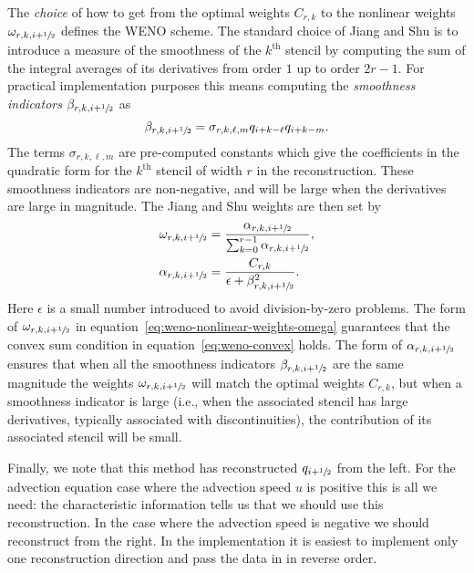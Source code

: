 The \emph{choice} of how to get from the optimal weights $C_{r, k}$ to the
nonlinear weights $\omega_{r, k, i+{\sfrac{1}{2}}}$ defines the WENO scheme. The
standard choice of Jiang and Shu is to introduce a measure of the smoothness of
the $k^{\text{th}}$ stencil by computing the sum of the integral averages of
its derivatives from order $1$ up to order $2 r - 1$. For practical
implementation purposes this means computing the \emph{smoothness indicators}
$\beta_{r, k, i+{\sfrac{1}{2}}}$ as
\begin{equation}
  \label{eq:weno-smoothness}
  \beta_{r, k, i+{\sfrac{1}{2}}} = \sigma_{r, k, \ell, m} q_{i+k-\ell} q_{i+k-m}.
\end{equation}
The terms $\sigma_{r, k, \ell, m}$ are pre-computed constants which give the
coefficients in the quadratic form for the $k^{\text{th}}$ stencil of width $r$
in the reconstruction. These smoothness indicators are non-negative, and will
be large when the derivatives are large in magnitude. The Jiang and Shu weights
are then set by
\begin{subequations}
  \label{eq:weno-nonlinear-weights}
  \begin{align}
    \label{eq:weno-nonlinear-weights-omega}
    \omega_{r, k, i+{\sfrac{1}{2}}} &= \frac{\alpha_{r, k, i+{\sfrac{1}{2}}}}{\sum_{k=0}^{r-1} \alpha_{r, k, i+{\sfrac{1}{2}}}}, \\
      \label{eq:weno-nonlinear-weights-alpha}
    \alpha_{r, k, i+{\sfrac{1}{2}}} &= \frac{C_{r, k}}{\epsilon + \beta_{r, k, i+{\sfrac{1}{2}}}^2}.
  \end{align}
\end{subequations}
Here $\epsilon$ is a small number introduced to avoid division-by-zero problems.
The form of $\omega_{r, k, i+{\sfrac{1}{2}}}$ in
equation~\eqref{eq:weno-nonlinear-weights-omega} guarantees that the convex sum
condition in equation~\eqref{eq:weno-convex} holds. The form of $\alpha_{r, k,
i+{\sfrac{1}{2}}}$ ensures that when all the smoothness indicators $\beta_{r, k,
i+{\sfrac{1}{2}}}$ are the same magnitude the weights $\omega_{r, k, i+{\sfrac{1}{2}}}$ will
match the optimal weights $C_{r, k}$, but when a smoothness indicator is large
(i.e., when the associated stencil has large derivatives, typically associated
with discontinuities), the contribution of its associated stencil will be small.

Finally, we note that this method has reconstructed $q_{i+{\sfrac{1}{2}}}$ from the
left. For the advection equation case where the advection speed $u$ is positive
this is all we need: the characteristic information tells us that we should use
this reconstruction. In the case where the advection speed is negative we
should reconstruct from the right. In the implementation it is easiest to
implement only one reconstruction direction and pass the data in in reverse
order.


